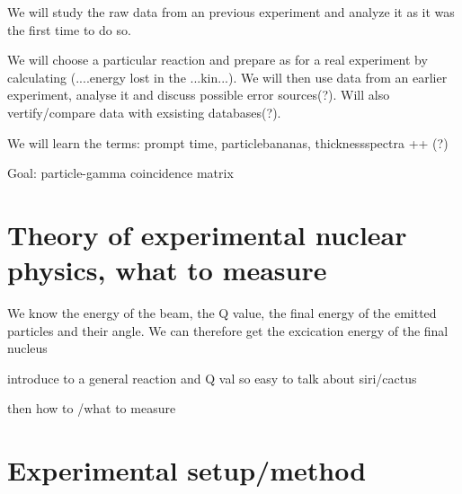 \documentclass[11pt,a4wide]{article}
\begin{document}
We will study the raw data from an previous experiment and analyze it as it was the first time to do so. 




We will choose a particular reaction and prepare as for a real experiment by calculating (....energy lost in the ...kin...). We will then use data from an earlier experiment, analyse it and discuss possible error sources(?). Will also vertify/compare data with exsisting databases(?).

We will learn the terms: prompt time, particlebananas, thicknessspectra ++ (?)

Goal: particle-gamma coincidence matrix

\section{Theory of experimental nuclear physics, what to measure}

We know the energy of the beam, the Q value, the final energy of the emitted particles and their angle. We can therefore get the excication energy of the final nucleus

introduce to a general reaction and Q val so easy to talk about siri/cactus

then how to /what to measure

\section{Experimental setup/method}
\end{document}
